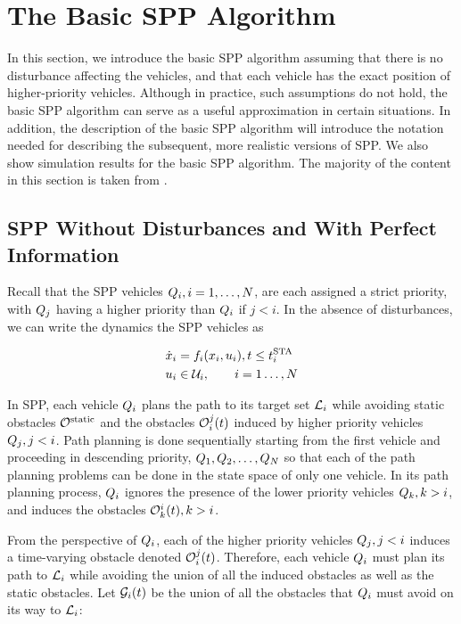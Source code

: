 \section{The Basic SPP Algorithm\label{sec:basic}}
In this section, we introduce the basic SPP algorithm assuming that there is no disturbance affecting the vehicles, and that each vehicle has the exact position of higher-priority vehicles. Although in practice, such assumptions do not hold, the basic SPP algorithm can serve as a useful approximation in certain situations. In addition, the description of the basic SPP algorithm will introduce the notation needed for describing the subsequent, more realistic versions of SPP. We also show simulation results for the basic SPP algorithm. The majority of the content in this section is taken from \cite{Chen15}.

\subsection{SPP Without Disturbances and With Perfect Information}
Recall that the SPP vehicles $Q_i, i=1,\ldots,N$, are each assigned a strict priority, with $Q_j$ having a higher priority than $Q_i$ if $j<i$. In the absence of disturbances, we can write the dynamics the SPP vehicles as

\begin{equation}
\label{eq:dyn_no_dstb}
\begin{aligned}
\dot\state_i &= \fdyn_i(\state_i, \ctrl_i), t \le \sta_i \\
\ctrl_i &\in \cset_i, \qquad i = 1 \ldots, \N
\end{aligned}
\end{equation}


In SPP, each vehicle $Q_i$ plans the path to its target set $\mathcal{L}_i$ while avoiding static obstacles $\mathcal{O}^\text{static}$ and the obstacles $\mathcal{O}_i^j(t)$ induced by higher priority vehicles $Q_j, j<i$. Path planning is done sequentially starting from the first vehicle and proceeding in descending priority, $Q_1, Q_2, \ldots, Q_{N}$ so that each of the path planning problems can be done in the state space of only one vehicle. In its path planning process, $Q_i$ ignores the presence of the lower priority vehicles $Q_k, k>i$, and induces the obstacles $\mathcal{O}_k^i(t), k>i$.

From the perspective of $Q_i$, each of the higher priority vehicles $Q_j, j<i$ induces a time-varying obstacle denoted $\mathcal{O}_i^j(t)$. Therefore, each vehicle $Q_i$ must plan its path to $\mathcal{L}_i$ while avoiding the union of all the induced obstacles as well as the static obstacles. Let $\mathcal{G}_i(t)$ be the union of all the obstacles that $Q_i$ must avoid on its way to $\mathcal{L}_i$:

